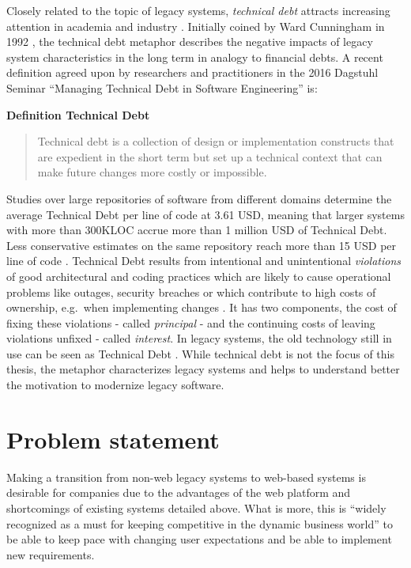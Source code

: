 Closely related to the topic of legacy systems, \emph{technical debt} attracts increasing attention in academia and industry \autocite{Li2015TDSMS,Yli-Huumo2016TD}.
Initially coined by Ward Cunningham in 1992 \autocite{Cunningham1992TD}, the technical debt metaphor describes the negative impacts of legacy system characteristics in the long term in analogy to financial debts.
A recent definition agreed upon by researchers and practitioners in the 2016 Dagstuhl Seminar ``Managing Technical Debt in Software Engineering'' is:

\textbf{Definition Technical Debt \autocite{Avgeriou2016TD}}

\begin{quote}
Technical debt is a collection of design or implementation constructs that are expedient in the short term but set up a technical context that can make future changes more costly or impossible.
\end{quote}

Studies over large repositories of software from different domains determine the average Technical Debt per line of code at 3.61 USD, meaning that larger systems with more than 300KLOC accrue more than 1 million USD of Technical Debt.
\autocite{CAST2011} Less conservative estimates on the same repository reach more than 15 USD per line of code \autocite{Curtis2012EstimatingTD}.
Technical Debt results from intentional and unintentional \emph{violations} of good architectural and coding practices which are likely to cause operational problems like outages, security breaches or which contribute to high costs of ownership, e.g.~when implementing changes \autocite{Curtis2012EstimatingTD}.
It has two components, the cost of fixing these violations - called \emph{principal} - and the continuing costs of leaving violations unfixed - called \emph{interest}.
In legacy systems, the old technology still in use can be seen as Technical Debt \autocite{Yli-Huumo2016TD}.
While technical debt is not the focus of this thesis, the metaphor characterizes legacy systems and helps to understand better the motivation to modernize legacy software.

\hypertarget{sec:problem}{%
\section{Problem statement}\label{sec:problem}}

Making a transition from non-web legacy systems to web-based systems is desirable for companies due to the advantages of the web platform and shortcomings of existing systems detailed above.
What is more, this is ``widely recognized as a must for keeping competitive in the dynamic business world'' \autocite{Aversano2001} to be able to keep pace with changing user expectations and be able to implement new requirements\autocite{Fuhr2013SOAMIG,Lucia2008}.

